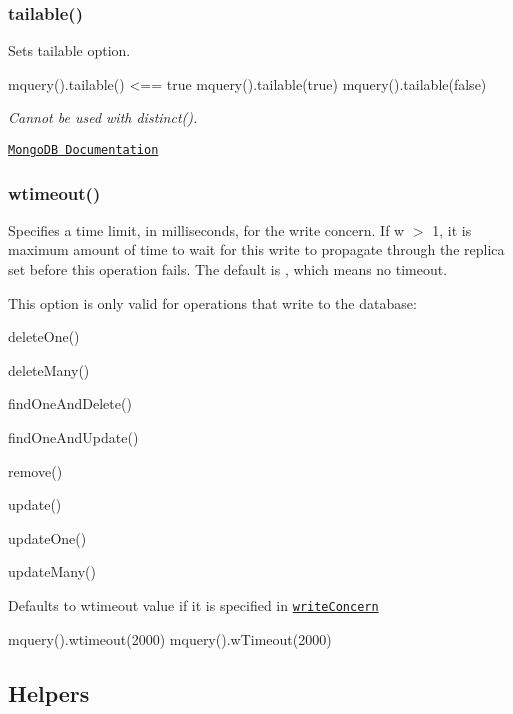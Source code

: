 \subsubsection*{tailable()}

Sets tailable option.


\begin{DoxyCode}
mquery().tailable() <== true
mquery().tailable(true)
mquery().tailable(false)
\end{DoxyCode}


{\itshape Cannot be used with {\ttfamily distinct()}.}

\href{http://docs.mongodb.org/manual/tutorial/create-tailable-cursor/}{\tt Mongo\+DB Documentation}

\subsubsection*{wtimeout()}

Specifies a time limit, in milliseconds, for the write concern. If {\ttfamily w $>$ 1}, it is maximum amount of time to wait for this write to propagate through the replica set before this operation fails. The default is {}, which means no timeout.

This option is only valid for operations that write to the database\+:


\begin{DoxyItemize}
\item {\ttfamily delete\+One()}
\item {\ttfamily delete\+Many()}
\item {\ttfamily find\+One\+And\+Delete()}
\item {\ttfamily find\+One\+And\+Update()}
\item {\ttfamily remove()}
\item {\ttfamily update()}
\item {\ttfamily update\+One()}
\item {\ttfamily update\+Many()}
\end{DoxyItemize}

Defaults to {\ttfamily wtimeout} value if it is specified in \href{#writeconcern}{\tt write\+Concern}


\begin{DoxyCode}
mquery().wtimeout(2000)
mquery().wTimeout(2000)
\end{DoxyCode}


\subsection*{Helpers}

